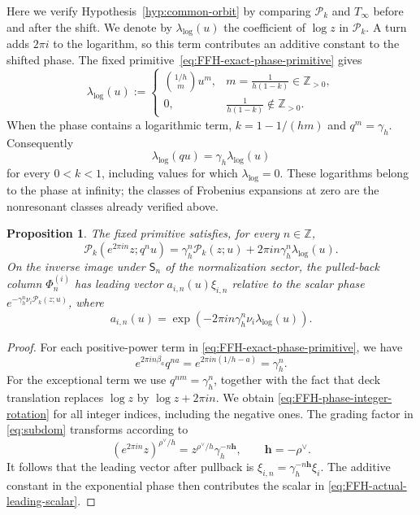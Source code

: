 \documentclass[11pt,leqno]{amsart}
\numberwithin{equation}{section}
\theoremstyle{plain}
\newtheorem{proposition}[theorem]{Proposition}
\theoremstyle{definition}
\theoremstyle{plain}
\theoremstyle{definition}
\theoremstyle{remark}
\begin{document}
Here we verify Hypothesis~\ref{hyp:common-orbit} by comparing $\mathcal P_k$ and $T_\infty$ before and after the shift.  We denote by $\lambda_{\log}(u)$ the coefficient of $\log z$ in $\mathcal P_k$.  A turn adds $2\pi i$ to the logarithm, so this term contributes an additive constant to the shifted phase.  The fixed primitive~\eqref{eq:FFH-exact-phase-primitive} gives
\begin{equation}\label{eq:FFH-log-coefficient}
 \lambda_{\log}(u):=\begin{cases}
 \displaystyle\binom{1/h}{m}u^m,
       &\displaystyle m=\frac1{h(1-k)}\in\mathbb Z_{>0},\\[4pt]
 0,&\displaystyle\frac1{h(1-k)}\notin\mathbb Z_{>0}.
 \end{cases}
\end{equation}
When the phase contains a logarithmic term, $k=1-1/(hm)$ and $q^m=\gamma_h$.  Consequently
\[
 \lambda_{\log}(qu)=\gamma_h\lambda_{\log}(u)
\]
for every $0<k<1$, including values for which $\lambda_{\log}=0$.  These logarithms belong to the phase at infinity; the classes of Frobenius expansions at zero are the nonresonant classes already verified above.

\begin{proposition}\label{prop:FFH-log-transport}
The fixed primitive satisfies, for every $n\in\mathbb Z$,
\begin{equation}\label{eq:FFH-phase-integer-rotation}
 \mathcal P_k(e^{2\pi in}z;q^nu)
 =\gamma_h^n\mathcal P_k(z;u)+2\pi in\gamma_h^n\lambda_{\log}(u).
\end{equation}
On the inverse image under $\mathsf S_n$ of the normalization sector, the pulled-back column $\Phi_n^{(i)}$ has leading vector $a_{i,n}(u)\xi_{i,n}$ relative to the scalar phase $e^{-\gamma_h^n\nu_i\mathcal P_k(z;u)}$, where
\begin{equation}\label{eq:FFH-actual-leading-scalar}
 a_{i,n}(u)=\exp(-2\pi in\gamma_h^n\nu_i\lambda_{\log}(u)).
\end{equation}
\end{proposition}
\begin{proof}
For each positive-power term in \eqref{eq:FFH-exact-phase-primitive}, we have
\[
 e^{2\pi in\beta_a}q^{na}=e^{2\pi in(1/h-a)}=\gamma_h^n.
\]
For the exceptional term we use $q^{nm}=\gamma_h^n$, together with the fact that deck translation replaces $\log z$ by $\log z+2\pi in$.  We obtain \eqref{eq:FFH-phase-integer-rotation} for all integer indices, including the negative ones.  The grading factor in \eqref{eq:subdom} transforms according to
\[
 (e^{2\pi in}z)^{\rho^\vee/h}
 =z^{\rho^\vee/h}\gamma_h^{-n\mathbf h},\qquad \mathbf h=-\rho^\vee.
\]
It follows that the leading vector after pullback is $\xi_{i,n}=\gamma_h^{-n\mathbf h}\xi_i$.  The additive constant in the exponential phase then contributes the scalar in \eqref{eq:FFH-actual-leading-scalar}.
\end{proof}
\end{document}
